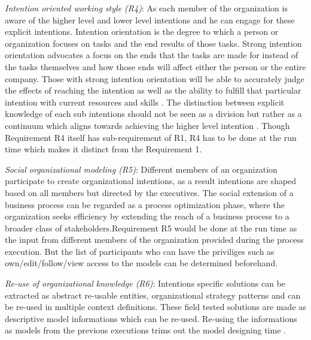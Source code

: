\textit{Intention oriented working style (R4)}: As each member of the organization is aware of the higher level and lower level intentions and he can engage for these explicit intentions. Intention orientation is the degree to which a person or organization focuses on tasks and the end results of those tasks. Strong intention orientation advocates a focus on the ends that the tasks are made for instead of the tasks themselves and how those ends will affect either the person or the entire company. Those with strong intention orientation will be able to accurately judge the effects of reaching the intention as well as the ability to fulfill that particular intention with current resources and skills \cite{Lacom}. The distinction between explicit knowledge of each sub intentions should not be seen as a division but rather as a continuum which aligns towards achieving the higher level intention . Though Requirement R4 itself has sub-requirement of R1, R4 has to be done at the run time which makes it distinct from the Requirement 1.

 \textit{Social organizational modeling (R5)}: Different members of an organization participate to create organizational intentions, as a result intentions are shaped based on all members but directed by the executives. The  social  extension  of  a  business  process  can  be  regarded  as  a  process optimization phase, where the organization seeks efficiency  by  extending  the  reach  of  a  business  process  to  a  broader  class  of  stakeholders\cite{Brambilla2012}.Requirement R5 would be done at the run time as the input from different members of the organization provided during the process execution. But the list of participants who can have the priviliges such as own/edit/follow/view access to the models can be determined beforehand.
 
 \textit{Re-use of organizational knowledge (R6)}: Intentions specific solutions can be extracted as abstract re-usable entities, organizational strategy patterns and can be re-used in multiple context definitions. These field tested solutions are made as descriptive model informations which can be re-used.  Re-using the informations as models from the previous executions trims out the model designing time \cite{Yu2000}.


